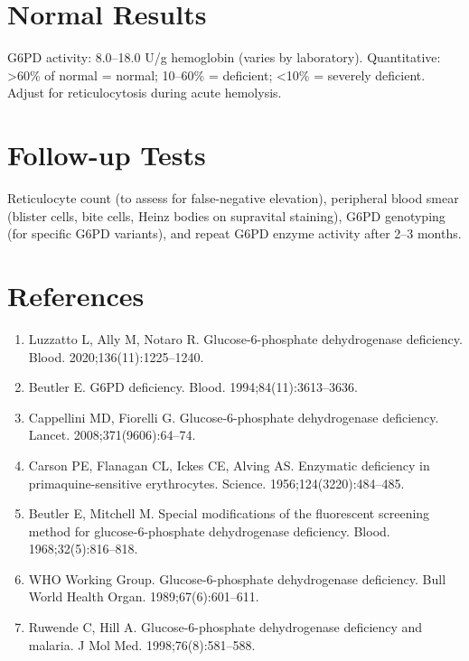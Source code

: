 \section*{Normal Results}
G6PD activity: 8.0--18.0 U/g hemoglobin (varies by laboratory). Quantitative: >60\% of normal = normal; 10--60\% = deficient; <10\% = severely deficient. Adjust for reticulocytosis during acute hemolysis.
\section*{Follow-up Tests}
Reticulocyte count (to assess for false-negative elevation), peripheral blood smear (blister cells, bite cells, Heinz bodies on supravital staining), G6PD genotyping (for specific G6PD variants), and repeat G6PD enzyme activity after 2--3 months.
\section*{References}
\begin{enumerate}
  \item Luzzatto L, Ally M, Notaro R. Glucose-6-phosphate dehydrogenase deficiency. Blood. 2020;136(11):1225--1240.
  \item Beutler E. G6PD deficiency. Blood. 1994;84(11):3613--3636.
  \item Cappellini MD, Fiorelli G. Glucose-6-phosphate dehydrogenase deficiency. Lancet. 2008;371(9606):64--74.
  \item Carson PE, Flanagan CL, Ickes CE, Alving AS. Enzymatic deficiency in primaquine-sensitive erythrocytes. Science. 1956;124(3220):484--485.
  \item Beutler E, Mitchell M. Special modifications of the fluorescent screening method for glucose-6-phosphate dehydrogenase deficiency. Blood. 1968;32(5):816--818.
  \item WHO Working Group. Glucose-6-phosphate dehydrogenase deficiency. Bull World Health Organ. 1989;67(6):601--611.
  \item Ruwende C, Hill A. Glucose-6-phosphate dehydrogenase deficiency and malaria. J Mol Med. 1998;76(8):581--588.
\end{enumerate}
\clearpage
